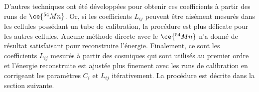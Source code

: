 
D'autres techniques ont été développées pour obtenir ces coefficients à partir des runs de $\ce{^{54}Mn}$. Or, si les coefficients $L_{ij}$ peuvent être aisément mesurés dans les cellules possédant un tube de calibration, la procédure est plus délicate pour les autres cellules. Aucune méthode directe avec le $\ce{^{54}Mn}$ n'a donné de résultat satisfaisant pour reconstruire l'énergie. Finalement, ce sont les coefficients $L_{ij}$ mesurés à partir des cosmiques qui sont utilisés au premier ordre et l'énergie reconstruite est ajustée plus finement avec les runs de calibration en corrigeant les paramètres $C_i$ et $L_{ij}$ itérativement. La procédure est décrite dans la section suivante.\\

